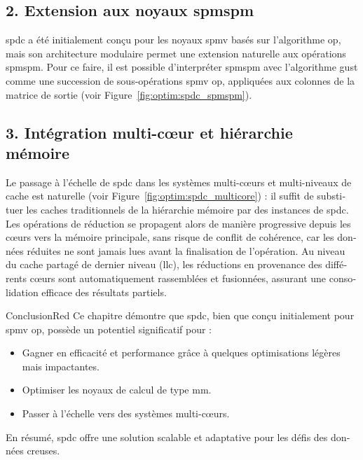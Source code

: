 \begin{otherlanguage}{french}
\subsection*{2. Extension aux noyaux \acrshort{spmspm}}

\acrlong{spdc} a été initialement conçu pour les noyaux \acrshort{spmv} basés sur l'algorithme \acrshort{op}, mais son architecture modulaire permet une extension naturelle aux opérations \acrshort{spmspm}.
Pour ce faire, il est possible d'interpréter \acrshort{spmspm} avec l'algorithme \acrlong{gust} comme une succession de sous-opérations \acrshort{spmv} \acrshort{op}, appliquées aux colonnes de la matrice de sortie (voir Figure~\ref{fig:optim:spdc_spmspm}).

\subsection*{3. Intégration multi-c\oe{}ur et hiérarchie mémoire}

Le passage à l'échelle de \acrlong{spdc} dans les systèmes multi-c\oe{}urs et multi-niveaux de cache est naturelle (voir Figure~\ref{fig:optim:spdc_multicore}) : il suffit de substituer les caches traditionnels de la hiérarchie mémoire par des instances de \acrlong{spdc}.
Les opérations de réduction se propagent alors de manière progressive depuis les c\oe{}urs vers la mémoire principale, sans risque de conflit de cohérence, car les données réduites ne sont jamais lues avant la finalisation de l'opération.
Au niveau du cache partagé de dernier niveau (\acrshort{llc}), les réductions en provenance des différents c\oe{}urs sont automatiquement rassemblées et fusionnées, assurant une consolidation efficace des résultats partiels.

\bigskip
\begin{highlight}{Conclusion}{Red}
    Ce chapitre démontre que \acrlong{spdc}, bien que conçu initialement pour \acrshort{spmv} \acrshort{op}, possède un potentiel significatif pour :
    \begin{itemize}
        \item Gagner en efficacité et performance grâce à quelques optimisations légères mais impactantes.
        \item Optimiser les noyaux de calcul de type \acrshort{mm}.
        \item Passer à l'échelle vers des systèmes multi-c\oe{}urs.
    \end{itemize}
    En résumé, \acrlong{spdc} offre une solution scalable et adaptative pour les défis des données creuses.
\end{highlight}


\end{otherlanguage}
